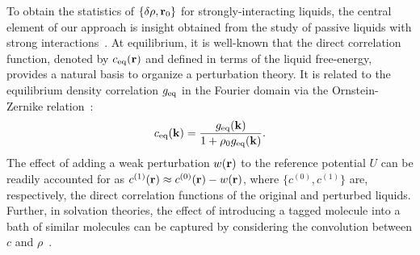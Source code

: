 \documentclass[superscriptaddress, twocolumn, prl, longbibliography, nofootinbib]{revtex4-1}
\begin{document}
To obtain the statistics of $\{\delta\rho, {\bf r}_0\}$ for strongly-interacting liquids, the central element of our approach is insight obtained from the study of passive liquids with strong interactions~\cite{Chandler1993, Hansen}. At equilibrium, it is well-known that the direct correlation function, denoted by $c_{\rm eq}({\bf r})$ and defined in terms of the liquid free-energy, provides a natural basis to organize a perturbation theory. It is related to the equilibrium density correlation $g_{\rm eq}$ in the Fourier domain via the Ornstein-Zernike relation~\cite{Hansen}:
\begin{equation}\label{eq:OZ}
    c_{\rm eq}({\bf k}) = \frac{g_{\rm eq}({\bf k})}{1 + \rho_0 g_{\rm eq}({\bf k})} .
\end{equation}
The effect of adding a weak perturbation $w({\bf r})$ to the reference potential $U$ can be readily accounted for as $c^{(1)}({\bf r}) \approx c^{(0)}({\bf r}) - w({\bf r})$, where $\{c^{(0)}, c^{(1)}\}$ are, respectively, the direct correlation functions of the original and perturbed liquids. Further, in solvation theories, the effect of introducing a tagged molecule into a bath of similar molecules can be captured by considering the convolution between $c$ and $\rho$~\cite{Chandler1993}.


\end{document}
